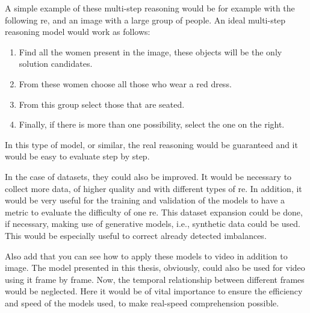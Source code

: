 \begin{exampleBox}
  A simple example of these multi-step reasoning would be for example with the
  following \gls{re},  and an image
  with a large group of people. An ideal multi-step reasoning model would work
  as follows:
  \begin{enumerate}
    \item Find all the women present in the image, these objects will be the only
    solution candidates.
    \item From these women choose all those who wear a red dress.
    \item From this group select those that are seated.
    \item Finally, if there is more than one possibility, select the one on the
    right.
  \end{enumerate}

  In this type of model, or similar, the real reasoning would be guaranteed and
  it would be easy to evaluate step by step.
\end{exampleBox}

In the case of datasets, they could also be improved. It would be necessary to
collect more data, of higher quality and with different types of \gls{re}. In
addition, it would be very useful for the training and validation of the models
to have a metric to evaluate the difficulty of one \gls{re}. This dataset
expansion could be done, if necessary, making use of generative models, i.e.,
synthetic data could be used. This would be especially useful to correct
already detected imbalances.

Also add that you can see how to apply these models to video in addition to
image. The model presented in this thesis, obviously, could also be used for
video using it frame by frame. Now, the temporal relationship between different
frames would be neglected. Here it would be of vital importance to ensure the
efficiency and speed of the models used, to make real-speed comprehension
possible.
